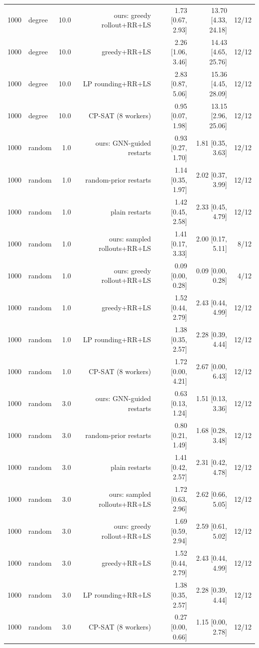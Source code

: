 \begin{table}[t]
\begin{tabular}{llrrrrr}
1000 & degree & 10.0 & ours: greedy rollout+RR+LS & 1.73 [0.67, 2.93] & 13.70 [4.33, 24.18] & 12/12 \\
1000 & degree & 10.0 & greedy+RR+LS & 2.26 [1.06, 3.46] & 14.43 [4.65, 25.76] & 12/12 \\
1000 & degree & 10.0 & LP rounding+RR+LS & 2.83 [0.87, 5.06] & 15.36 [4.45, 28.09] & 12/12 \\
1000 & degree & 10.0 & CP-SAT (8 workers) & 0.95 [0.07, 1.98] & 13.15 [2.96, 25.06] & 12/12 \\
1000 & random & 1.0 & ours: GNN-guided restarts & 0.93 [0.27, 1.70] & 1.81 [0.35, 3.63] & 12/12 \\
1000 & random & 1.0 & random-prior restarts & 1.14 [0.35, 1.97] & 2.02 [0.37, 3.99] & 12/12 \\
1000 & random & 1.0 & plain restarts & 1.42 [0.45, 2.58] & 2.33 [0.45, 4.79] & 12/12 \\
1000 & random & 1.0 & ours: sampled rollouts+RR+LS & 1.41 [0.17, 3.33] & 2.00 [0.17, 5.11] & 8/12 \\
1000 & random & 1.0 & ours: greedy rollout+RR+LS & 0.09 [0.00, 0.28] & 0.09 [0.00, 0.28] & 4/12 \\
1000 & random & 1.0 & greedy+RR+LS & 1.52 [0.44, 2.79] & 2.43 [0.44, 4.99] & 12/12 \\
1000 & random & 1.0 & LP rounding+RR+LS & 1.38 [0.35, 2.57] & 2.28 [0.39, 4.44] & 12/12 \\
1000 & random & 1.0 & CP-SAT (8 workers) & 1.72 [0.00, 4.21] & 2.67 [0.00, 6.43] & 12/12 \\
1000 & random & 3.0 & ours: GNN-guided restarts & 0.63 [0.13, 1.24] & 1.51 [0.13, 3.36] & 12/12 \\
1000 & random & 3.0 & random-prior restarts & 0.80 [0.21, 1.49] & 1.68 [0.28, 3.48] & 12/12 \\
1000 & random & 3.0 & plain restarts & 1.41 [0.42, 2.57] & 2.31 [0.42, 4.78] & 12/12 \\
1000 & random & 3.0 & ours: sampled rollouts+RR+LS & 1.72 [0.63, 2.96] & 2.62 [0.66, 5.05] & 12/12 \\
1000 & random & 3.0 & ours: greedy rollout+RR+LS & 1.69 [0.59, 2.94] & 2.59 [0.61, 5.02] & 12/12 \\
1000 & random & 3.0 & greedy+RR+LS & 1.52 [0.44, 2.79] & 2.43 [0.44, 4.99] & 12/12 \\
1000 & random & 3.0 & LP rounding+RR+LS & 1.38 [0.35, 2.57] & 2.28 [0.39, 4.44] & 12/12 \\
1000 & random & 3.0 & CP-SAT (8 workers) & 0.27 [0.00, 0.66] & 1.15 [0.00, 2.78] & 12/12 \\

\end{tabular}
\end{table}
